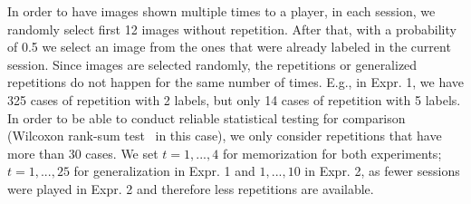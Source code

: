 In order to have images shown multiple times to a player,  in each session, 
we randomly select first 12 images without repetition. After that, with a probability of 0.5
we select an image from the ones that were already labeled in the current session. 
%
Since images are selected randomly, 
the repetitions or generalized repetitions do not happen for the same number of times. 
E.g., in Expr. 1, we have 325 cases of repetition with 2 labels, but only 14 cases of repetition with 5 labels. 
In order to be able to conduct reliable statistical testing for comparison (Wilcoxon rank-sum test~\cite{Wilcoxon45} in this case), 
we only consider repetitions that have more than 30 cases.  
We set $t=1, ..., 4$ for memorization for both experiments; 
$t=1, ..., 25$ for generalization in Expr. 1 and $1, ..., 10$ in Expr. 2, 
as fewer sessions were played in Expr. 2 and therefore less repetitions are available.


\fi









